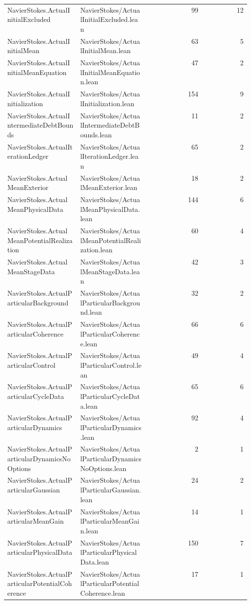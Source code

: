 \begin{longtable}{p{0.30\linewidth}p{0.28\linewidth}rr}
NavierStokes.ActualInitialExcluded & NavierStokes/ActualInitialExcluded.lean & 99 & 12\\
NavierStokes.ActualInitialMean & NavierStokes/ActualInitialMean.lean & 63 & 5\\
NavierStokes.ActualInitialMeanEquation & NavierStokes/ActualInitialMeanEquation.lean & 47 & 2\\
NavierStokes.ActualInitialization & NavierStokes/ActualInitialization.lean & 154 & 9\\
NavierStokes.ActualIntermediateDebtBounds & NavierStokes/ActualIntermediateDebtBounds.lean & 11 & 2\\
NavierStokes.ActualIterationLedger & NavierStokes/ActualIterationLedger.lean & 65 & 2\\
NavierStokes.ActualMeanExterior & NavierStokes/ActualMeanExterior.lean & 18 & 2\\
NavierStokes.ActualMeanPhysicalData & NavierStokes/ActualMeanPhysicalData.lean & 144 & 6\\
NavierStokes.ActualMeanPotentialRealization & NavierStokes/ActualMeanPotentialRealization.lean & 60 & 4\\
NavierStokes.ActualMeanStageData & NavierStokes/ActualMeanStageData.lean & 42 & 3\\
NavierStokes.ActualParticularBackground & NavierStokes/ActualParticularBackground.lean & 32 & 2\\
NavierStokes.ActualParticularCoherence & NavierStokes/ActualParticularCoherence.lean & 66 & 6\\
NavierStokes.ActualParticularControl & NavierStokes/ActualParticularControl.lean & 49 & 4\\
NavierStokes.ActualParticularCycleData & NavierStokes/ActualParticularCycleData.lean & 65 & 6\\
NavierStokes.ActualParticularDynamics & NavierStokes/ActualParticularDynamics.lean & 92 & 4\\
NavierStokes.ActualParticularDynamicsNoOptions & NavierStokes/ActualParticularDynamicsNoOptions.lean & 2 & 1\\
NavierStokes.ActualParticularGaussian & NavierStokes/ActualParticularGaussian.lean & 24 & 2\\
NavierStokes.ActualParticularMeanGain & NavierStokes/ActualParticularMeanGain.lean & 14 & 1\\
NavierStokes.ActualParticularPhysicalData & NavierStokes/ActualParticularPhysicalData.lean & 150 & 7\\
NavierStokes.ActualParticularPotentialCoherence & NavierStokes/ActualParticularPotentialCoherence.lean & 17 & 1\\

\end{longtable}
